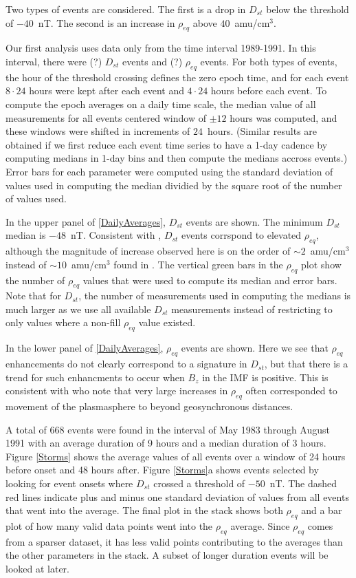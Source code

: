 \documentclass[10pt,twocolumn]{article}
\begin{document}
Two types of events are considered. The first is a drop in $D_{st}$ below the threshold of $-40$~nT.  The second is an increase in $\rho_{eq}$ above $40$~amu/cm$^3$.

Our first analysis uses data only from the time interval 1989-1991.  In this interval, there were (?) $D_{st}$ events and (?) $\rho_{eq}$ events.  For both types of events, the hour of the threshold crossing defines the zero epoch time, and for each event $8\cdot24$ hours were kept after each event and $4\cdot24$ hours before each event.  To compute the epoch averages on a daily time scale, the median value of all measurements for all events centered window of $\pm 12$ hours was computed, and these windows were shifted in increments of $24$~hours. (Similar results are obtained if we first reduce each event time series to have a 1-day cadence by computing medians in 1-day bins and then compute the medians accross events.)  Error bars for each parameter were computed using the standard deviation of values used in computing the median dividied by the square root of the number of values used.

In the upper panel of \ref{DailyAverages}, $D_{st}$ events are shown.  The minimum $D_{st}$ median is $-48$~nT.  Consistent with \cite{Takahashi2010}, $D_{st}$ events corrspond to elevated $\rho_{eq}$, although the magnitude of increase observed here is on the order of $\sim2$~amu/cm$^3$ instead of $\sim10$~amu/cm$^3$ found in \cite{Takahashi2010}.  The vertical green bars in the $\rho_{eq}$ plot show the number of $\rho_{eq}$ values that were used to compute its median and error bars.  Note that for $D_{st}$, the number of measurements used in computing the medians is much larger as we use all available $D_{st}$ measurements instead of restricting to only values where a non-fill $\rho_{eq}$ value existed.  

In the lower panel of \ref{DailyAverages}, $\rho_{eq}$ events are shown.  Here we see that $\rho_{eq}$ enhancements do not clearly correspond to a signature in $D_{st}$, but that there is a trend for such enhancments to occur when $B_{z}$ in the IMF is positive.  This is consistent with \cite{Takahashi2010} who note that very large increases in $\rho_{eq}$ often corresponded to movement of the plasmasphere to beyond geosynchronous distances. 

A total of 668 events were found in the interval of May 1983 through August 1991 with an average duration of 9 hours and a median duration of 3 hours. Figure \ref{Storms} shows the average values of all events over a window of 24 hours before onset and 48 hours after. Figure \ref{Storms}a shows events selected by looking for event onsets where $D_{st}$ crossed a threshold of $-50$~nT. The dashed red lines indicate plus and minus one standard deviation of values from all events that went into the average. The final plot in the stack shows both $\rho_{eq}$ and a bar plot of how many valid data points went into the $\rho_{eq}$ average. Since $\rho_{eq}$ comes from a sparser dataset, it has less valid points contributing to the averages than the other parameters in the stack. A subset of longer duration events will be looked at later. 
\end{document}
